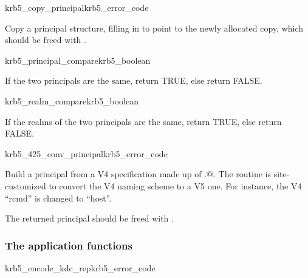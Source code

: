 \begin{funcdecl}{krb5_copy_principal}{krb5_error_code}{\funcinout}
\funcin
{}
\funcout
{}
\end{funcdecl}

Copy a principal structure, filling in  to point to
the newly allocated copy, which should be freed with
.

\begin{funcdecl}{krb5_principal_compare}{krb5_boolean}{\funcinout}
\funcin
{}
\end{funcdecl}

If the two principals are the same, return TRUE, else return FALSE.

\begin{funcdecl}{krb5_realm_compare}{krb5_boolean}{\funcinout}
\funcin
{}
\end{funcdecl}

If the realms of the two principals are the same, return TRUE, else
return FALSE. 


\begin{funcdecl}{krb5_425_conv_principal}{krb5_error_code}{\funcinout}
\funcin
{}
\funcout
{}
\end{funcdecl}

Build a principal  from a V4 specification made up of 
.@. The routine is
site-customized to convert the V4 naming scheme to a V5 one. For
instance, the V4 ``rcmd'' is changed to ``host''. 

The returned principal should be freed with
. 

\subsubsection{The application functions}

\begin{funcdecl}{krb5_encode_kdc_rep}{krb5_error_code}{\funcin}
\funcinout
{}
\funcout
{}
\end{funcdecl}

